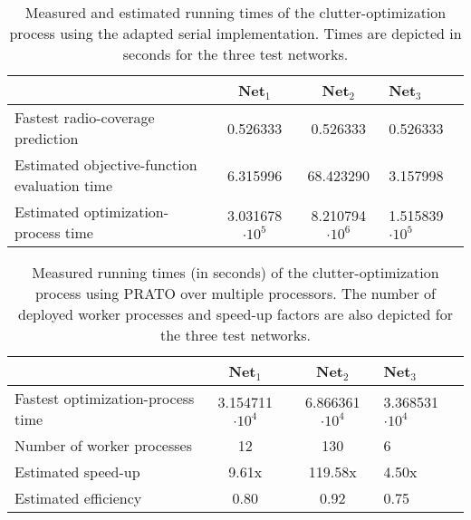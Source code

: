 \begin{table}
\caption{Measured and estimated running times of the clutter-optimization process
using the adapted serial implementation. Times are depicted in seconds
for the three test networks. \label{tab:Performance-analysis-serial}}


{\footnotesize{\centering}}{\footnotesize \par}

\begin{tabular}{>{\raggedright}p{2.5cm}cc>{\centering}p{1.5cm}}
\cline{2-4} 
 & Net$_{1}$ & Net$_{2}$ & Net$_{3}$\tabularnewline
\hline 
{\footnotesize{Fastest radio-coverage prediction}} & {\footnotesize{0.526333}} & {\footnotesize{0.526333}} & {\footnotesize{0.526333}}\tabularnewline
\hline 
{\footnotesize{Estimated objective-function evaluation time}} & {\footnotesize{6.315996}} & {\footnotesize{68.423290}} & {\footnotesize{3.157998}}\tabularnewline
\hline 
{\footnotesize{Estimated optimization-process time}} & {\footnotesize{3.031678$\cdot10^{5}$}} & {\footnotesize{8.210794$\cdot10^{6}$}} & {\footnotesize{1.515839$\cdot10^{5}$}}\tabularnewline
\hline 
\end{tabular}
\end{table}


\begin{table}
\caption{Measured running times (in seconds) of the clutter-optimization process
using PRATO over multiple processors. The number of deployed worker
processes and speed-up factors are also depicted for the three test
networks. \label{tab:Performance-analysis-parallel}}


{\footnotesize{\centering}}{\footnotesize \par}

\begin{tabular}{>{\raggedright}p{2.5cm}cc>{\centering}p{1.5cm}}
\cline{2-4} 
 & Net$_{1}$ & Net$_{2}$ & Net$_{3}$\tabularnewline
\hline 
{\footnotesize{Fastest optimization-process time}} & {\footnotesize{3.154711$\cdot10^{4}$}} & {\footnotesize{6.866361$\cdot10^{4}$}} & {\footnotesize{3.368531$\cdot10^{4}$}}\tabularnewline
\hline 
{\footnotesize{Number of worker processes}} & {\footnotesize{12}} & {\footnotesize{130}} & {\footnotesize{6}}\tabularnewline
\hline 
{\footnotesize{Estimated speed-up}} & {\footnotesize{9.61x}} & {\footnotesize{119.58x}} & {\footnotesize{4.50x}}\tabularnewline
\hline 
{\footnotesize{Estimated efficiency}} & {\footnotesize{0.80}} & {\footnotesize{0.92}} & {\footnotesize{0.75}}\tabularnewline
\hline 
\end{tabular}
\end{table}



